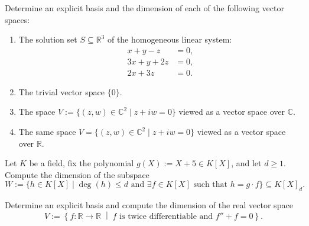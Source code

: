 \begin{exercise}
\label{exc:bases_dimensions_various_spaces}
Determine an explicit basis and the dimension of each of the following vector spaces:
\begin{enumerate}
    \item The solution set $S \subseteq \mathbb{R}^3$ of the homogeneous linear system:
    \[
    \begin{aligned}
    x + y - z &= 0, \\
    3x + y + 2z &= 0, \\
    2x + 3z &= 0.
    \end{aligned}
    \]
    \item The trivial vector space $\{0\}$.
    \item The space $V := \{(z, w) \in \mathbb{C}^2 \mid z + iw = 0\}$ viewed as a vector space over $\mathbb{C}$.
    \item The same space $V = \{(z, w) \in \mathbb{C}^2 \mid z + iw = 0\}$ viewed as a vector space over $\mathbb{R}$.
\end{enumerate}
\end{exercise}

\begin{exercise}
\label{exc:polynomials_linear_factor_dimension}
Let $K$ be a field, fix the polynomial $g(X) := X + 5 \in K[X]$, and let $d \ge 1$. Compute the dimension of the subspace
\[
W := \{h \in K[X] \mid \deg(h) \le d \text{ and } \exists f \in K[X] \text{ such that } h = g \cdot f\} \subseteq K[X]_d.
\]
\end{exercise}

\begin{exercise}
\label{exc:harmonic_ode_solution_space}
Determine an explicit basis and compute the dimension of the real vector space
\[
V := \left\{ f \colon \mathbb{R} \to \mathbb{R} \;\middle|\; f \text{ is twice differentiable and } f'' + f = 0 \right\}.
\]
\end{exercise}

